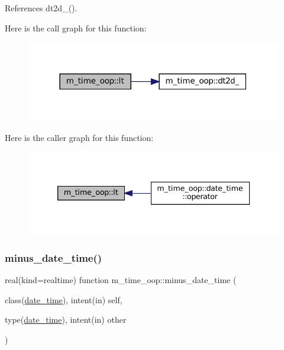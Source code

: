 References dt2d\+\_\+().

Here is the call graph for this function\+:\nopagebreak
\begin{figure}[H]
\begin{center}
\leavevmode
\includegraphics[width=316pt]{namespacem__time__oop_ab0c5ce86d25993804501d59a8106818f_cgraph}
\end{center}
\end{figure}
Here is the caller graph for this function\+:\nopagebreak
\begin{figure}[H]
\begin{center}
\leavevmode
\includegraphics[width=339pt]{namespacem__time__oop_ab0c5ce86d25993804501d59a8106818f_icgraph}
\end{center}
\end{figure}
\mbox{\label{namespacem__time__oop_a3da83a42a8f957db9bd2f6f0b942ab99}} 
\subsubsection{\texorpdfstring{minus\+\_\+date\+\_\+time()}{minus\_date\_time()}}
{\footnotesize\ttfamily real(kind=realtime) function m\+\_\+time\+\_\+oop\+::minus\+\_\+date\+\_\+time (\begin{DoxyParamCaption}\item[{class(\mbox{\hyperlink{structm__time__oop_1_1date__time}{date\+\_\+time}}), intent(in)}]{self,  }\item[{type(\mbox{\hyperlink{structm__time__oop_1_1date__time}{date\+\_\+time}}), intent(in)}]{other }\end{DoxyParamCaption})\hspace{0.3cm}{\ttfamily [private]}}



